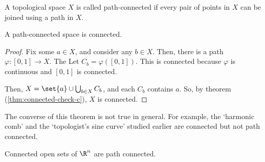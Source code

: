\begin{ndfn}
  A topological space $X$ is called path-connected if every pair of points in $X$ can be joined using a path in $X$.
\end{ndfn}

\begin{nthm}\label{thm:connected-path-connected}
  A path-connected space is connected.
\end{nthm}
\begin{proof}
  Fix some $a \in X$, and consider any $b \in X$. Then, there is a path $\varphi: [0,1] \to X$. The Let $C_b = \varphi([0,1])$. This is connected because $\varphi$ is continuous and $[0,1]$ is connected.

  Then, $X = \set{a} \cup \bigcup_{b \in X} C_b$, and each $C_b$ contains $a$. So, by theorem (\ref{thm:connected-check-c}), $X$ is connected.
\end{proof}

The converse of this theorem is not true in general. For example, the `harmonic comb' and the `topologist's sine curve' studied earlier are connected but not path connected.

\begin{nprop}
  Connected open sets of $\R^n$ are path connected.
\end{nprop}
